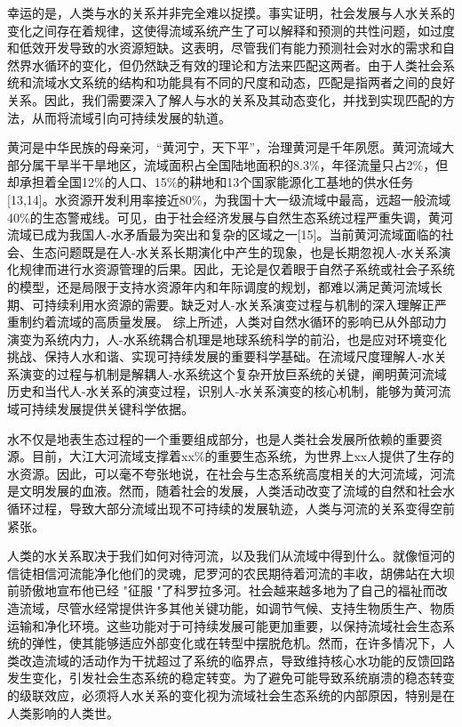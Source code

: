 幸运的是，人类与水的关系并非完全难以捉摸。事实证明，社会发展与人水关系的变化之间存在着规律，这使得流域系统产生了可以解释和预测的共性问题，如过度和低效开发导致的水资源短缺。这表明，尽管我们有能力预测社会对水的需求和自然界水循环的变化，但仍然缺乏有效的理论和方法来匹配这两者。由于人类社会系统和流域水文系统的结构和功能具有不同的尺度和动态，匹配是指两者之间的良好关系。因此，我们需要深入了解人与水的关系及其动态变化，并找到实现匹配的方法，从而将流域引向可持续发展的轨道。

黄河是中华民族的母亲河，“黄河宁，天下平”，治理黄河是千年夙愿。黄河流域大部分属干旱半干旱地区，流域面积占全国陆地面积的8.3\%，年径流量只占2\%，但却承担着全国12\%的人口、15\%的耕地和13个国家能源化工基地的供水任务[13,14]。水资源开发利用率接近80\%，为我国十大一级流域中最高，远超一般流域40\%的生态警戒线。可见，由于社会经济发展与自然生态系统过程严重失调，黄河流域已成为我国人-水矛盾最为突出和复杂的区域之一[15]。当前黄河流域面临的社会、生态问题既是在人-水关系长期演化中产生的现象，也是长期忽视人-水关系演化规律而进行水资源管理的后果。因此，无论是仅着眼于自然子系统或社会子系统的模型，还是局限于支持水资源年内和年际调度的规划，都难以满足黄河流域长期、可持续利用水资源的需要。缺乏对人-水关系演变过程与机制的深入理解正严重制约着流域的高质量发展。
综上所述，人类对自然水循环的影响已从外部动力演变为系统内力，人-水系统耦合机理是地球系统科学的前沿，也是应对环境变化挑战、保持人水和谐、实现可持续发展的重要科学基础。在流域尺度理解人-水关系演变的过程与机制是解耦人-水系统这个复杂开放巨系统的关键，阐明黄河流域历史和当代人-水关系的演变过程，识别人-水关系演变的核心机制，能够为黄河流域可持续发展提供关键科学依据。

水不仅是地表生态过程的一个重要组成部分，也是人类社会发展所依赖的重要资源。目前，大江大河流域支撑着xx\%的重要生态系统，为世界上xx人提供了生存的水资源。因此，可以毫不夸张地说，在社会与生态系统高度相关的大河流域，河流是文明发展的血液。然而，随着社会的发展，人类活动改变了流域的自然和社会水循环过程，导致大部分流域出现不可持续的发展轨迹，人类与河流的关系变得空前紧张。

人类的水关系取决于我们如何对待河流，以及我们从流域中得到什么。就像恒河的信徒相信河流能净化他们的灵魂，尼罗河的农民期待着河流的丰收，胡佛站在大坝前骄傲地宣布他已经 "征服 "了科罗拉多河。社会越来越多地为了自己的福祉而改造流域，尽管水经常提供许多其他关键功能，如调节气候、支持生物质生产、物质运输和净化环境。这些功能对于可持续发展可能更加重要，以保持流域社会生态系统的弹性，使其能够适应外部变化或在转型中摆脱危机。然而，在许多情况下，人类改造流域的活动作为干扰超过了系统的临界点，导致维持核心水功能的反馈回路发生变化，引发社会生态系统的稳定转变。为了避免可能导致系统崩溃的稳态转变的级联效应，必须将人水关系的变化视为流域社会生态系统的内部原因，特别是在人类影响的人类世。

